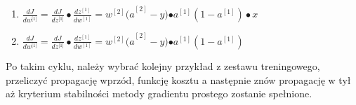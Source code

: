 \begin{enumerate}
\def\labelenumi{\arabic{enumi}.}
\setcounter{enumi}{7}
\item
  \(\frac{dJ}{dw^{\lbrack 1\rbrack}} = \frac{dJ}{dz^{\lbrack 1\rbrack}} \bullet \frac{dz^{\left\lbrack 1 \right\rbrack}}{dw^{\left\lbrack 1 \right\rbrack}} = {w^{\left\lbrack 2 \right\rbrack}(a}^{\left\lbrack 2 \right\rbrack} - y){\bullet a}^{\left\lbrack 1 \right\rbrack}(1 - a^{\left\lbrack 1 \right\rbrack}) \bullet x\)
\item
  \(\frac{dJ}{dw^{\lbrack 1\rbrack}} = \frac{dJ}{dz^{\lbrack 1\rbrack}} \bullet \frac{dz^{\left\lbrack 1 \right\rbrack}}{dw^{\left\lbrack 1 \right\rbrack}} = {w^{\left\lbrack 2 \right\rbrack}(a}^{\left\lbrack 2 \right\rbrack} - y){\bullet a}^{\left\lbrack 1 \right\rbrack}(1 - a^{\left\lbrack 1 \right\rbrack})\)
\end{enumerate}

Po takim cyklu, należy wybrać kolejny przykład z zestawu treningowego, przeliczyć propagację wprzód, funkcję kosztu a następnie znów propagację w tył aż kryterium stabilności metody gradientu prostego zostanie spełnione.


